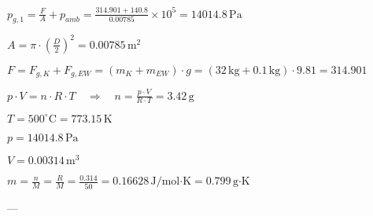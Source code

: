 \( p_{g,1} = \frac{F}{A} + p_{amb} = \frac{314.901 + 140.8}{0.00785} \times 10^5 = 14014.8 \, \text{Pa} \)  

\( A = \pi \cdot \left(\frac{D}{2}\right)^2 = 0.00785 \, \text{m}^2 \)  

\( F = F_{g,K} + F_{g,EW} = (m_K + m_{EW}) \cdot g = (32 \, \text{kg} + 0.1 \, \text{kg}) \cdot 9.81 = 314.901 \)  

\( p \cdot V = n \cdot R \cdot T \quad \Rightarrow \quad n = \frac{p \cdot V}{R \cdot T} = 3.42 \, \text{g} \)  

\( T = 500^\circ \text{C} = 773.15 \, \text{K} \)  

\( p = 14014.8 \, \text{Pa} \)  

\( V = 0.00314 \, \text{m}^3 \)  

\( m = \frac{n}{M} = \frac{R}{M} = \frac{0.314}{50} = 0.16628 \, \text{J/mol·K} = 0.799 \, \text{g·K} \)  

---